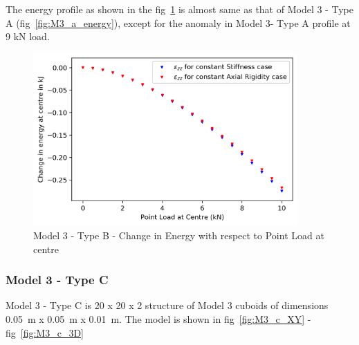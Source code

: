 The energy profile as shown in the fig~\ref{fig:M3_b_energy} is almost same as that of Model 3 - Type A (fig~\ref{fig:M3_a_energy}), except for the anomaly in Model 3- Type A profile at 9 kN load. 

\begin{figure}[!htbp]
    \centering
    \includegraphics[width = 0.9\textwidth]{Figures/M3_b_energy.png}
    \caption{Model 3 - Type B - Change in Energy with respect to Point Load at centre}
    \label{fig:M3_b_energy}
\end{figure}

 \newpage
 \subsubsection{Model 3 - Type C}
 Model 3 - Type C is 20 x 20 x 2 structure of Model 3 cuboids of dimensions 0.05~m x 0.05~m x 0.01~m. The model is shown in fig~\ref{fig:M3_c_XY} - fig~\ref{fig:M3_c_3D}


